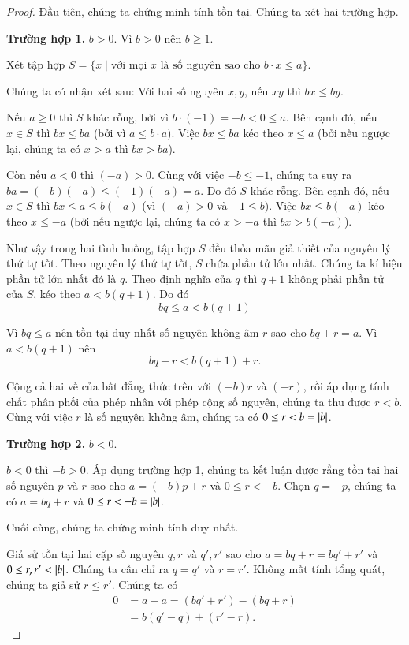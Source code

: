 \begin{proof}
    Đầu tiên, chúng ta chứng minh tính tồn tại. Chúng ta xét hai trường hợp.

    \textbf{Trường hợp 1.} $b > 0$. Vì $b > 0$ nên $b\geq 1$.

    Xét tập hợp $S = \{ x \mid \text{với mọi $x$ là số nguyên sao cho $b\cdot x\leq a$} \}$.

    Chúng ta có nhận xét sau: Với hai số nguyên $x, y$, nếu $xy$ thì $bx \leq by$.
    \bigskip

    Nếu $a\geq 0$ thì $S$ khác rỗng, bởi vì $b\cdot (-1) = -b < 0 \leq a$. Bên cạnh đó, nếu $x\in S$ thì $bx \leq ba$ (bởi vì $a\leq b\cdot a$). Việc $bx \leq ba$ kéo theo $x\leq a$ (bởi nếu ngược lại, chúng ta có $x > a$ thì $bx > ba$).

    Còn nếu $a < 0$ thì $(-a) > 0$. Cùng với việc $-b\leq -1$, chúng ta suy ra $ba = (-b)(-a)\leq (-1)(-a) = a$. Do đó $S$ khác rỗng. Bên cạnh đó, nếu $x\in S$ thì $bx \leq a\leq b(-a)$ (vì $(-a) > 0$ và $-1\leq b$). Việc $bx\leq b(-a)$ kéo theo $x\leq -a$ (bởi nếu ngược lại, chúng ta có $x > -a$ thì $bx > b(-a)$).

    Như vậy trong hai tình huống, tập hợp $S$ đều thỏa mãn giả thiết của nguyên lý thứ tự tốt. Theo nguyên lý thứ tự tốt, $S$ chứa phần tử lớn nhất. Chúng ta kí hiệu phần tử lớn nhất đó là $q$. Theo định nghĩa của $q$ thì $q+1$ không phải phần tử của $S$, kéo theo $a < b(q + 1)$. Do đó
    \[
        bq\leq a < b(q + 1)
    \]

    Vì $bq\leq a$ nên tồn tại duy nhất số nguyên không âm $r$ sao cho $bq + r = a$. Vì $a < b(q + 1)$ nên
    \[
        bq + r < b(q + 1) + r.
    \]

    Cộng cả hai vế của bất đẳng thức trên với $(-b)r$ và $(-r)$, rồi áp dụng tính chất phân phối của phép nhân với phép cộng số nguyên, chúng ta thu được $r < b$. Cùng với việc $r$ là số nguyên không âm, chúng ta có $0\leq r < b = \left\vert{b}\right\vert$.

    \textbf{Trường hợp 2.} $b < 0$.

    $b < 0$ thì $-b > 0$. Áp dụng trường hợp 1, chúng ta kết luận được rằng tồn tại hai số nguyên $p$ và $r$ sao cho $a = (-b)p + r$ và $0\leq r < -b$. Chọn $q = -p$, chúng ta có $a = bq + r$ và $0\leq r < -b = \left\vert{b}\right\vert$.

    \bigskip

    Cuối cùng, chúng ta chứng minh tính duy nhất.

    Giả sử tồn tại hai cặp số nguyên $q, r$ và $q', r'$ sao cho $a = bq + r = bq' + r'$ và $0\leq r, r' < \left\vert{b}\right\vert$. Chúng ta cần chỉ ra $q = q'$ và $r = r'$. Không mất tính tổng quát, chúng ta giả sử $r\leq r'$. Chúng ta có
    \begin{align*}
        0 & = a - a = (bq' + r') - (bq + r) \\
          & = b(q' - q) + (r' - r).
    \end{align*}


\end{proof}
